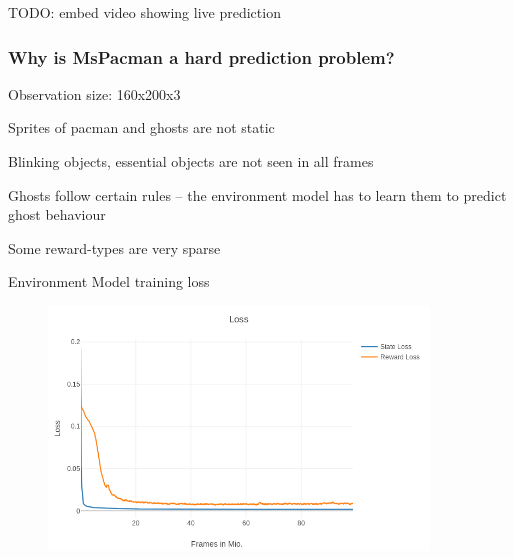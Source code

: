 \begin{frame}
TODO: embed video showing live prediction
\end{frame}


\begin{frame}
	\frametitle{Why is MsPacman a hard prediction problem?}
	\begin{PraesentationAufzaehlung}
		\item Observation size: 160x200x3
		\item Sprites of pacman and ghosts are not static
		\item Blinking objects, essential objects are not seen in all frames
		\item Ghosts follow certain rules -- the environment model has to learn them to predict ghost behaviour
		\item Some reward-types are very sparse
	\end{PraesentationAufzaehlung}
\end{frame}

    
\begin{frame}{Environment Model training loss}
	\vspace{-10mm}
   	\begin{figure}
       \centering
        \includegraphics[width=0.9\textwidth]{./latent_i2a_images/EnvironmentModel_dSSM-DET_training.png}
    \end{figure}
\end{frame}





